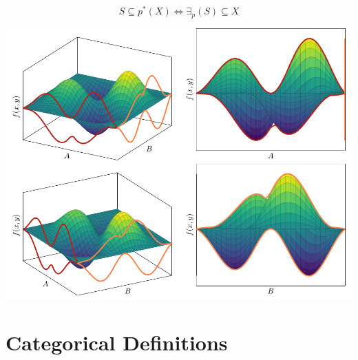 \documentclass[10pt]{article}
\theoremstyle{definition}
\theoremstyle{remark}
\begin{document}
\begin{equation}
    S \subseteq p^{\ast} ( X ) \Longleftrightarrow \exists_p ( S ) \subseteq X
\end{equation}

\begin{center}
    \includegraphics[]{figures/min_max_multivariate_function/figure.pdf}
\end{center}

\section*{Categorical Definitions}
\end{document}
